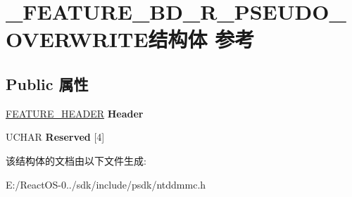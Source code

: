 \hypertarget{struct___f_e_a_t_u_r_e___b_d___r___p_s_e_u_d_o___o_v_e_r_w_r_i_t_e}{}\section{\+\_\+\+F\+E\+A\+T\+U\+R\+E\+\_\+\+B\+D\+\_\+\+R\+\_\+\+P\+S\+E\+U\+D\+O\+\_\+\+O\+V\+E\+R\+W\+R\+I\+T\+E结构体 参考}
\label{struct___f_e_a_t_u_r_e___b_d___r___p_s_e_u_d_o___o_v_e_r_w_r_i_t_e}
\subsection*{Public 属性}
\begin{DoxyCompactItemize}
\item 
\mbox{\label{struct___f_e_a_t_u_r_e___b_d___r___p_s_e_u_d_o___o_v_e_r_w_r_i_t_e_ae7a626e4f3f0982677b7dcd87892e21a}} 
\hyperlink{struct___f_e_a_t_u_r_e___h_e_a_d_e_r}{F\+E\+A\+T\+U\+R\+E\+\_\+\+H\+E\+A\+D\+ER} {\bfseries Header}
\item 
\mbox{\label{struct___f_e_a_t_u_r_e___b_d___r___p_s_e_u_d_o___o_v_e_r_w_r_i_t_e_ac5ea6763f8e1ffc64f96ff35e6734df6}} 
U\+C\+H\+AR {\bfseries Reserved} \mbox{[}4\mbox{]}
\end{DoxyCompactItemize}


该结构体的文档由以下文件生成\+:\begin{DoxyCompactItemize}
\item 
E\+:/\+React\+O\+S-\/0../sdk/include/psdk/ntddmmc.\+h\end{DoxyCompactItemize}
